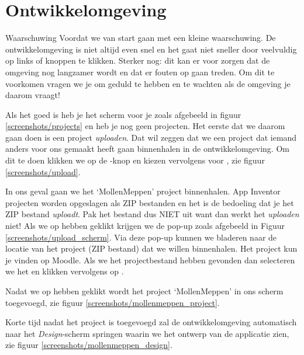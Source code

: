 \chapter{Ontwikkelomgeving}
\label{chap:ontwikkelomgeving}

\begin{derivation}{Waarschuwing}
Voordat we van start gaan met \ai een kleine waarschuwing. De ontwikkelomgeving is niet altijd even snel en het gaat niet sneller door veelvuldig op links of knoppen te klikken. Sterker nog: dit kan er voor zorgen dat de omgeving nog langzamer wordt en dat er fouten op gaan treden. Om dit te voorkomen vragen we je om geduld te hebben en te wachten als de omgeving je daarom vraagt!
\end{derivation}

Als het goed is heb je het scherm voor je zoals afgebeeld in figuur \ref{screenshots/projects} en heb je nog geen projecten. Het eerste dat we daarom gaan doen is een project \emph{uploaden}. Dat wil zeggen dat we een project dat iemand anders voor ons gemaakt heeft gaan binnenhalen in de  ontwikkelomgeving. Om dit te doen klikken we op de -knop en kiezen vervolgens voor , zie figuur \ref{screenshots/upload}.


In ons geval gaan we het `MollenMeppen' project binnenhalen. App Inventor projecten worden opgeslagen als ZIP bestanden en het is de bedoeling dat je het ZIP bestand \emph{uploadt}. Pak het bestand dus NIET uit want dan werkt het \emph{uploaden} niet! Als we op  hebben geklikt krijgen we de pop-up zoals afgebeeld in Figuur \ref{screenshots/upload_scherm}. Via deze pop-up kunnen we bladeren naar de locatie van het project (ZIP bestand) dat we willen binnenhalen. Het project kun je vinden op Moodle.
Als we het projectbestand hebben gevonden dan selecteren we het en klikken vervolgens op .
 
Nadat  we op  hebben geklikt wordt het project `MollenMeppen' in ons scherm toegevoegd, zie figuur \ref{screenshots/mollenmeppen_project}.


Korte tijd nadat het project is toegevoegd zal de ontwikkelomgeving automatisch naar het \emph{Design}-scherm springen waarin we het ontwerp van de applicatie zien, zie figuur \ref{screenshots/mollenmeppen_design}. 

